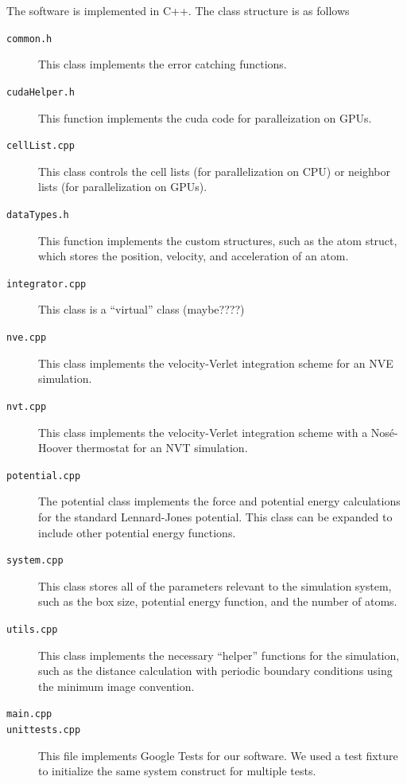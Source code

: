 \documentclass[12pt]{article}
\begin{document}
The software is implemented in C++.
%
The class structure is as follows
\begin{description}

\item[\texttt{common.h}] This class implements the error catching functions.

\item[\texttt{cudaHelper.h}] This function implements the cuda code for paralleization on GPUs.

\item[\texttt{cellList.cpp}] This class controls the cell lists (for parallelization on CPU) or neighbor lists (for parallelization on GPUs). 

\item[\texttt{dataTypes.h}] This function implements the custom structures, such as the atom struct, which stores the position, velocity, and acceleration of an atom.
	
\item[\texttt{integrator.cpp}] This class is a ``virtual'' class (maybe????)

\item[\texttt{nve.cpp}] This class implements the velocity-Verlet integration scheme for an NVE simulation.

\item[\texttt{nvt.cpp}] This class implements the velocity-Verlet integration scheme with a Nos\'{e}-Hoover thermostat for an NVT simulation.

\item[\texttt{potential.cpp}] The potential class implements the force and potential energy calculations for the standard Lennard-Jones potential. 
%
This class can be expanded to include other potential energy functions.

\item[\texttt{system.cpp}] This class stores all of the parameters relevant to the simulation system, such as the box size, potential energy function, and the number of atoms. 

\item[\texttt{utils.cpp}] This class implements the necessary ``helper'' functions for the simulation, such as the distance calculation with periodic boundary conditions using the minimum image convention.

\item[\texttt{main.cpp}]

\item[\texttt{unittests.cpp}] This file implements Google Tests for our software. 
%
We used a test fixture to initialize the same system construct for multiple tests.

\end{description}
\end{document}

